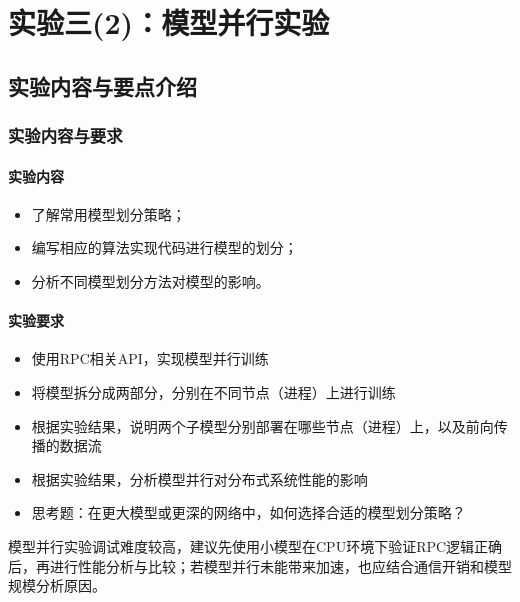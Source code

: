 \chapter{实验三(2)：模型并行实验}

\section{实验内容与要点介绍}

\subsection{实验内容与要求}
\subsubsection{实验内容}
\begin{itemize}
    \item 了解常用模型划分策略；
    \item 编写相应的算法实现代码进行模型的划分；
    \item 分析不同模型划分方法对模型的影响。
\end{itemize}

\subsubsection{实验要求}
\begin{itemize}
    \item 使用RPC相关API，实现模型并行训练
    \item 将模型拆分成两部分，分别在不同节点（进程）上进行训练
    \item 根据实验结果，说明两个子模型分别部署在哪些节点（进程）上，以及前向传播的数据流
    \item 根据实验结果，分析模型并行对分布式系统性能的影响
    \item 思考题：在更大模型或更深的网络中，如何选择合适的模型划分策略？
\end{itemize}

模型并行实验调试难度较高，建议先使用小模型在CPU环境下验证RPC逻辑正确后，再进行性能分析与比较；若模型并行未能带来加速，也应结合通信开销和模型规模分析原因。

